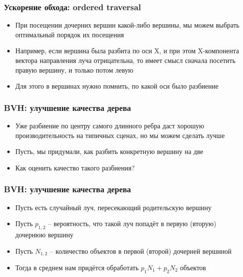 \documentclass[10pt]{beamer}
\begin{document}
\begin{frame}[fragile]
\frametitle{Ускорение обхода: ordered traversal}
\begin{itemize}
\item При посещении дочерних вершин какой-либо вершины, мы можем выбрать оптимальный порядок их посещения
\pause
\item Например, если вершина была разбита по оси X, и при этом X-компонента вектора направления луча отрицательна, то имеет смысл сначала посетить правую вершину, и только потом левую
\pause
\item Для этого в вершинах нужно помнить, по какой оси было разбиение
\end{itemize}
\end{frame}

\begin{frame}[fragile]
\frametitle{BVH: улучшение качества дерева}
\begin{itemize}
\item Уже разбиение по центру самого длинного ребра даст хорошую производительность на типичных сценах, но мы можем сделать лучше
\pause
\item Пусть, мы придумали, как разбить конкретную вершину на две
\pause
\item Как оценить качество такого разбиения?
\end{itemize}
\end{frame}

\begin{frame}[fragile]
\frametitle{BVH: улучшение качества дерева}
\begin{itemize}
\item Пусть есть случайный луч, пересекающий родительскую вершину
\pause
\item Пусть \begin{math}p_{1,2}\end{math} -- вероятность, что такой луч попадёт в первую (вторую) дочернюю вершину
\pause
\item Пусть \begin{math}N_{1,2}\end{math} -- количество объектов в первой (второй) дочерней вершиной
\pause
\item Тогда в среднем нам придётся обработать \begin{math}p_1N_1+p_2N_2\end{math} объектов
\end{itemize}
\end{frame}
\end{document}
